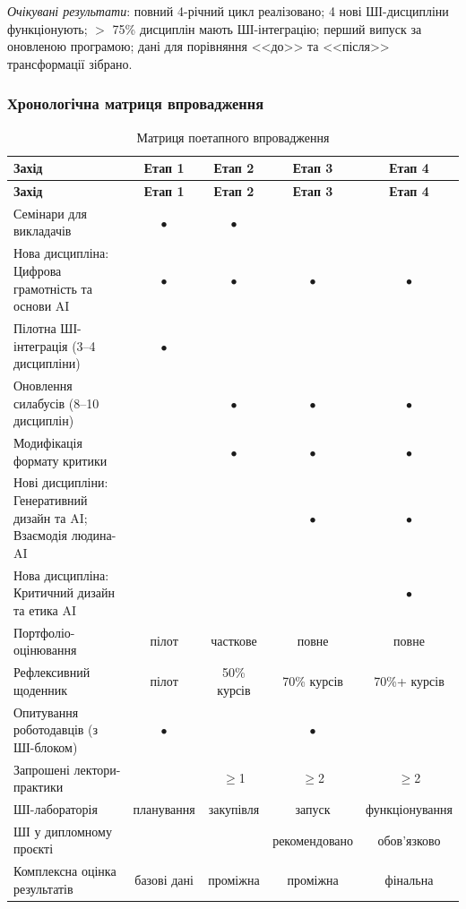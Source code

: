 \textit{Очікувані результати}: повний 4-річний цикл реалізовано; 4 нові ШІ-дисципліни функціонують; $>$ 75\% дисциплін мають ШІ-інтеграцію; перший випуск за оновленою програмою; дані для порівняння <<до>> та <<після>> трансформації зібрано.

\subsubsection{Хронологічна матриця впровадження}\label{sssec:3.3.4}

\begin{longtable}{@{}p{}cccc@{}}
\caption{Матриця поетапного впровадження}\label{tab:implementation-matrix} \\
\hline
\textbf{Захід} & \textbf{Етап 1} & \textbf{Етап 2} & \textbf{Етап 3} & \textbf{Етап 4} \\
\hline
\endfirsthead
\hline
\textbf{Захід} & \textbf{Етап 1} & \textbf{Етап 2} & \textbf{Етап 3} & \textbf{Етап 4} \\
\hline
\endhead
Семінари для викладачів & $\bullet$ & $\bullet$ & & \\
\addlinespace
Нова дисципліна: Цифрова грамотність та основи AI & $\bullet$ & $\bullet$ & $\bullet$ & $\bullet$ \\
\addlinespace
Пілотна ШІ-інтеграція (3--4 дисципліни) & $\bullet$ & & & \\
\addlinespace
Оновлення силабусів (8--10 дисциплін) & & $\bullet$ & $\bullet$ & $\bullet$ \\
\addlinespace
Модифікація формату критики & & $\bullet$ & $\bullet$ & $\bullet$ \\
\addlinespace
Нові дисципліни: Генеративний дизайн та AI; Взаємодія людина-AI & & & $\bullet$ & $\bullet$ \\
\addlinespace
Нова дисципліна: Критичний дизайн та етика AI & & & & $\bullet$ \\
\addlinespace
Портфоліо-оцінювання & пілот & часткове & повне & повне \\
\addlinespace
Рефлексивний щоденник & пілот & 50\% курсів & 70\% курсів & 70\%+ курсів \\
\addlinespace
Опитування роботодавців (з ШІ-блоком) & $\bullet$ & & $\bullet$ & \\
\addlinespace
Запрошені лектори-практики & & $\geq$1 & $\geq$2 & $\geq$2 \\
\addlinespace
ШІ-лабораторія & планування & закупівля & запуск & функціонування \\
\addlinespace
ШІ у дипломному проєкті & & & рекомендовано & обов'язково \\
\addlinespace
Комплексна оцінка результатів & базові дані & проміжна & проміжна & фінальна \\
\hline
\end{longtable}

